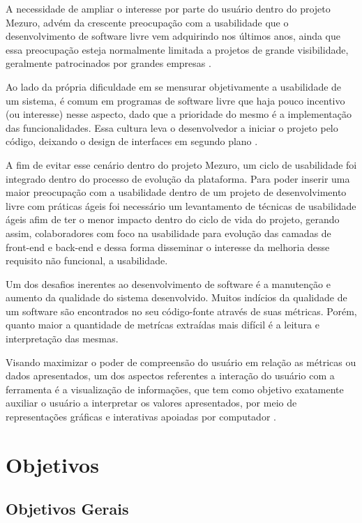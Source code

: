 A necessidade de ampliar o interesse por parte do usuário dentro do projeto Mezuro, advém da crescente preocupação com a usabilidade que o desenvolvimento de software livre vem adquirindo nos últimos anos, ainda que essa preocupação esteja normalmente limitada a projetos de grande visibilidade, geralmente patrocinados por grandes empresas \cite{nichols2006}.

Ao lado da própria dificuldade em se mensurar objetivamente a usabilidade de um sistema, é comum em programas de software livre que haja pouco incentivo (ou interesse) nesse aspecto, dado que a prioridade do mesmo é a implementação das funcionalidades. Essa cultura leva o desenvolvedor a iniciar o projeto pelo código, deixando o design de interfaces em segundo plano  \cite{thomas2008}.

A fim de evitar esse cenário dentro do projeto Mezuro, um ciclo de usabilidade foi integrado dentro do processo de evolução da plataforma. Para poder inserir uma maior preocupação com a usabilidade dentro de um projeto de desenvolvimento livre com práticas ágeis foi necessário um levantamento de técnicas de usabilidade ágeis afim de ter o menor impacto dentro do ciclo de vida do projeto, gerando assim, colaboradores com foco na usabilidade para evolução das camadas de front-end e back-end e dessa forma disseminar o interesse da melhoria desse requisito não funcional, a usabilidade.

Um dos desafios inerentes ao desenvolvimento de software é a manutenção e aumento da qualidade do sistema desenvolvido. Muitos indícios da qualidade de um software são encontrados no seu código-fonte através de suas métricas. Porém, quanto maior a quantidade de metrícas extraídas mais difícil é a leitura e interpretação das mesmas.

Visando maximizar o poder de compreensão do usuário em relação as métricas ou dados apresentados, um dos aspectos referentes a interação do usuário com a ferramenta é a visualização de informações, que tem como objetivo exatamente auxiliar o usuário a interpretar os valores apresentados, por meio de representações gráficas e interativas apoiadas por computador \cite{rafaelmessiasmartins2012}.

\section{Objetivos}

\subsection{Objetivos Gerais}

